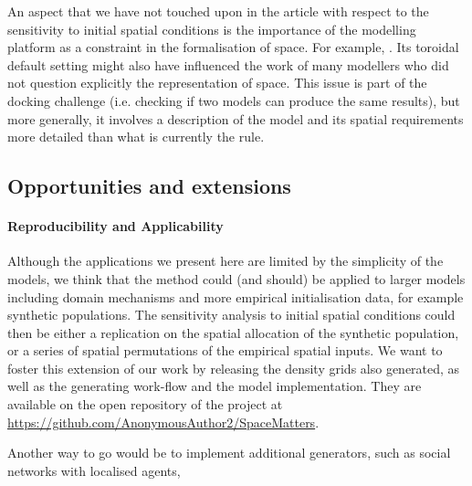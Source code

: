\documentclass[preprint,5p,times,twocolumn,authoryear]{elsarticle}
\begin{document}
An aspect that we have not touched upon in the article with respect to the sensitivity to initial spatial conditions is the importance of the modelling platform as a constraint in the formalisation of space. For example, . Its toroidal default setting might also have influenced the work of many modellers who did not question explicitly the representation of space. This issue is part of the docking challenge \citep{Axtelletal1996} (i.e. checking if two models can produce the same results), but more generally, it involves a description of the model and its spatial requirements more detailed than what is currently the rule.



\subsection{Opportunities and extensions}


\paragraph{Reproducibility and Applicability} 


Although the applications we present here are limited by the simplicity of the models, we think that the method could (and should) be applied to larger models including domain mechanisms and more empirical initialisation data, for example synthetic populations. The sensitivity analysis to initial spatial conditions could then be either a replication on the spatial allocation of the synthetic population, or a series of spatial permutations of the empirical spatial inputs.
We want to foster this extension of our work by releasing the density grids also generated, as well as the generating work-flow and the model implementation. They are available on the open repository of the project at \url{https://github.com/AnonymousAuthor2/SpaceMatters}. 

Another way to go would be to implement additional generators, such as social networks \citep{alizadeh2016generating} with localised agents,  
\end{document}
